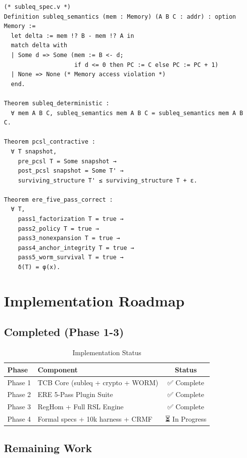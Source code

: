 \documentclass[11pt,a4paper]{article}
\begin{document}
\begin{lstlisting}[caption={Coq SUBLEQ Semantics}, label=lst:coq]
(* subleq_spec.v *)
Definition subleq_semantics (mem : Memory) (A B C : addr) : option Memory :=
  let delta := mem !? B - mem !? A in
  match delta with
  | Some d => Some (mem := B <- d; 
                    if d <= 0 then PC := C else PC := PC + 1)
  | None => None (* Memory access violation *)
  end.

Theorem subleq_deterministic :
  ∀ mem A B C, subleq_semantics mem A B C = subleq_semantics mem A B C.

Theorem pcsl_contractive :
  ∀ T snapshot,
    pre_pcsl T = Some snapshot →
    post_pcsl snapshot = Some T' →
    surviving_structure T' ≤ surviving_structure T + ε.

Theorem ere_five_pass_correct :
  ∀ T,
    pass1_factorization T = true →
    pass2_policy T = true →
    pass3_nonexpansion T = true →
    pass4_anchor_integrity T = true →
    pass5_worm_survival T = true →
    δ(T) = φ(x).
\end{lstlisting}

\section{Implementation Roadmap}

\subsection{Completed (Phase 1-3)}

\begin{table}[h]
\centering
\caption{Implementation Status}
\label{tab:implementation_status}
\begin{tabular}{@{}l l c@{}}
\toprule
\textbf{Phase} & \textbf{Component} & \textbf{Status} \\
\midrule
Phase 1 & TCB Core (subleq + crypto + WORM) & ✅ Complete \\
Phase 2 & ERE 5-Pass Plugin Suite & ✅ Complete \\
Phase 3 & RegHom + Full RSL Engine & ✅ Complete \\
Phase 4 & Formal specs + 10k harness + CRMF & ⏳ In Progress \\
\bottomrule
\end{tabular}
\end{table}

\subsection{Remaining Work}
\end{document}

